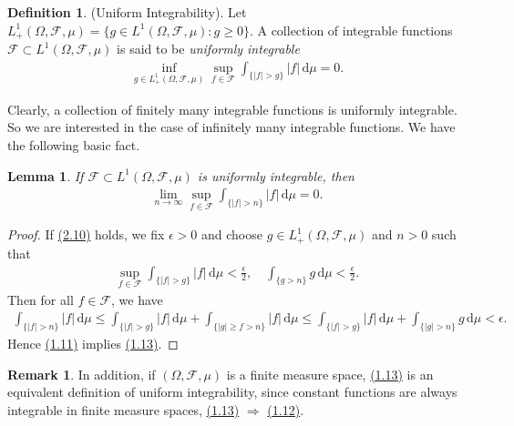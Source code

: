\documentclass{article}
\numberwithin{equation}{section}
\renewcommand{\d}{\mathrm{d}}
\theoremstyle{plain}
\newtheorem{lemma}[theorem]{Lemma}
\theoremstyle{definition}
\newtheorem{definition}[theorem]{Definition}
\newtheorem*{remark}{Remark}
\begin{document}
\begin{definition}\label{def:1.70} (Uniform Integrability). Let $L^1_+(\Omega,\mathscr{F},\mu) = \{g\in L^1(\Omega,\mathscr{F},\mu):g\geq 0\}$. A collection of integrable functions $\mathcal{F}\subset L^1(\Omega,\mathscr{F},\mu)$ is said to be \textit{uniformly integrable} \begin{align*}
	\inf_{g\in L_+^1(\Omega,\mathscr{F},\mu)}\sup_{f\in\mathcal{F}}\int_{\{\vert f\vert>g\}}\vert f\vert\,\d \mu=0.\tag{1.12}\label{eq:1.12}
\end{align*}
\end{definition}
Clearly, a collection of finitely many integrable functions is uniformly integrable. So we are interested in the case of infinitely many integrable functions. We have the following basic fact.
\begin{lemma}\label{lemma:1.71} If $\mathcal{F}\subset L^1(\Omega,\mathscr{F},\mu)$ is uniformly integrable, then
\begin{align*}
	\lim_{n\to\infty}\sup_{f\in\mathcal{F}}\int_{\{\vert f\vert > n\}}\vert f\vert\,\d \mu = 0.\label{eq:1.13}\tag{1.13}
\end{align*}
\end{lemma}
\begin{proof}
If \hyperref[eq:2.10]{(2.10)} holds, we fix $\epsilon>0$ and choose $g\in L^1_+(\Omega,\mathscr{F},\mu)$ and $n>0$ such that
\begin{align*}
	\sup_{f\in\mathcal{F}}\int_{\{\vert f\vert>g\}}\vert f\vert\,\d \mu < \frac{\epsilon}{2},\quad \int_{\{g>n\}}g\,\d \mu <\frac{\epsilon}{2}.
\end{align*}
Then for all $f\in\mathcal{F}$, we have
\begin{align*}
	\int_{\{\vert f\vert>n\}}\vert f\vert\,\d \mu \leq \int_{\{\vert f\vert>g\}}\vert f\vert\,\d \mu + \int_{\{\vert g\vert\geq f>n\}}\vert f\vert\,\d \mu \leq \int_{\{\vert f\vert>g\}}\vert f\vert\,\d \mu + \int_{\{\vert g\vert>n\}}g\,\d \mu < \epsilon.
\end{align*}
Hence \hyperref[eq:1;12]{(1.11)} implies \hyperref[eq:1.13]{(1.13)}.
\end{proof}
\begin{remark} In addition, if $(\Omega,\mathscr{F},\mu)$ is a finite measure space, \hyperref[eq:1.13]{(1.13)} is an equivalent definition of uniform integrability, since constant functions are always integrable in finite measure spaces, \hyperref[eq:1.13]{(1.13)} $\Rightarrow$ \hyperref[eq:1.12]{(1.12)}.
\end{remark}
\end{document}
